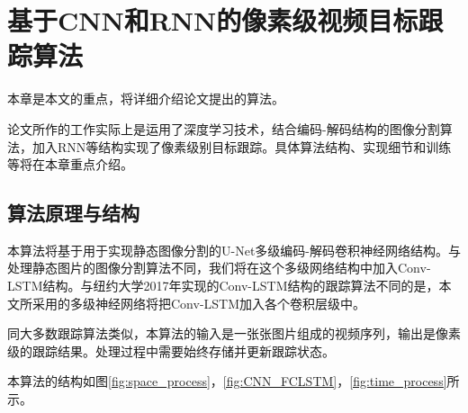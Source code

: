
\chapter{基于CNN和RNN的像素级视频目标跟踪算法} \label{section:chap4}
本章是本文的重点，将详细介绍论文提出的算法。
\par
论文所作的工作实际上是运用了深度学习技术，结合编码-解码结构的图像分割算法，加入RNN等结构实现了像素级别目标跟踪。具体算法结构、实现细节和训练等将在本章重点介绍。

\section{算法原理与结构}
本算法将基于用于实现静态图像分割的U-Net\supercite{ronneberger2015u}多级编码-解码卷积神经网络结构。与处理静态图片的图像分割算法不同，我们将在这个多级网络结构中加入Conv-LSTM结构。与纽约大学2017年实现的Conv-LSTM结构的跟踪算法不同的是，本文所采用的多级神经网络将把Conv-LSTM加入各个卷积层级中。
\par
同大多数跟踪算法类似，本算法的输入是一张张图片组成的视频序列，输出是像素级的跟踪结果。处理过程中需要始终存储并更新跟踪状态。
\par
本算法的结构如图\ref{fig:space_process}，\ref{fig:CNN_FCLSTM}，\ref{fig:time_process}所示。

